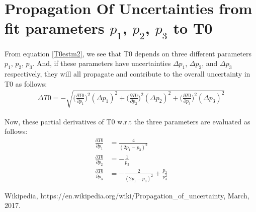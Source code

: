 \documentclass[12pt,epsfig]{article}
\begin{document}
\section{Propagation Of Uncertainties from fit parameters $p_1$, $p_2$, $p_3$ to T0}
From equation \ref{T0estm2}, we see that T0 depends on three different parameters $p_1$, $p_2$, $p_3$. And, if these parameters have
uncertainties $\Delta p_1$, $\Delta p_2$, and $\Delta p_3$ respectively, they will all propagate\cite{wikiErrProp} and contribute to the overall uncertainty in T0 as follows:
\begin{equation}
\label{apT0err}
\begin{aligned}
  \Delta T0    =  - \sqrt{\Big(\frac{\partial T0}{\partial p_1} \Big)^2 (\Delta p_1)^2
    +  \Big(\frac{\partial T0}{\partial p_2} \Big)^2 (\Delta p_2)^2
    +  \Big(\frac{\partial T0}{\partial p_3} \Big)^2 (\Delta p_3)^2}
\end{aligned}
\end{equation}

Now, these partial derivatives of T0 w.r.t the three parameters are evaluated as follows:
\begin{equation}
\label{dT0BydP123}
\begin{aligned}
  \frac{\partial T0}{\partial p_1} & =  \frac{4}{  (2p_1 - p_3)^2}  \\
  \frac{\partial T0}{\partial p_2} & =  -\frac{ 1}{ p_3} \\
  \frac{\partial T0}{\partial p_3} & =  -\frac{ 2}{ (2p_1 - p_3)^2} + \frac{ p_2}{ p^2_3}
\end{aligned}
\end{equation}




\begin{thebibliography}{9}
   Wikipedia, https://en.wikipedia.org/wiki/Propagation\_of\_uncertainty, March, 2017.
\end{thebibliography}
\end{document}
